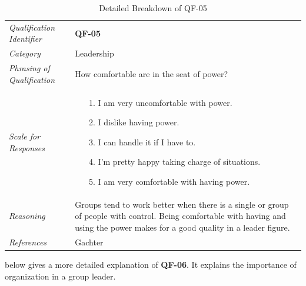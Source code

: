\documentclass[12pt,letterpaper]{article}
\begin{document}
\begin{table}[H]
	\caption{Detailed Breakdown of QF-05}
	\begin{tabu} to 
		\toprule
		Qualification Identifier & {\bf QF-05}\\
		Category & Leadership \\
		Phrasing of Qualification & How comfortable are in the seat of power? \\
		Scale for Responses &
		\begin{minipage}[t]{\linewidth}
			\begin{enumerate}
				\item[1.] I am very uncomfortable with power.
				\item[2.] I dislike having power.
				\item[3.] I can handle it if I have to.
				\item[4.] I'm pretty happy taking charge of situations.
				\item[5.] I am very comfortable with having power.
			\end{enumerate}
		\end{minipage}\\
		Reasoning & Groups tend to work better when there is a single or group of people with control. Being comfortable with having and using the power makes for a good quality in a leader figure.\\
		References & Gachter\cite{gachter}\\
		\toprule
	\end{tabu}
\end{table}

 below gives a more detailed explanation of {\bf QF-06}. It explains the importance of organization in a group leader.
\end{document}
